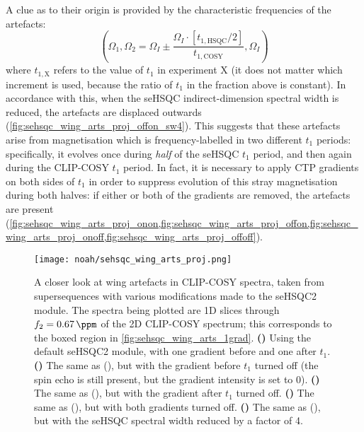 A clue as to their origin is provided by the characteristic frequencies of the artefacts:
\begin{equation}
    \label{eq:wing_artefact_frequencies}
    \left(\Omega_1, \Omega_2 = \Omega_I \pm \frac{\Omega_I \cdot [t_{1,\text{HSQC}}/2]}{t_{1,\text{COSY}}}, \Omega_I\right)
\end{equation}
where $t_{1,\text{X}}$ refers to the value of $t_1$ in experiment X (it does not matter which increment is used, because the ratio of $t_1$ in the fraction above is constant).
In accordance with this, when the seHSQC indirect-dimension spectral width is reduced, the artefacts are displaced outwards (\cref{fig:sehsqc_wing_arts_proj_offon_sw4}).
This suggests that these artefacts arise from  magnetisation which is frequency-labelled in two different $t_1$ periods: specifically, it evolves once during \textit{half} of the seHSQC $t_1$ period, and then again during the CLIP-COSY $t_1$ period.
In fact, it is necessary to apply CTP gradients on both sides of $t_1$ in order to suppress evolution of this stray magnetisation during both halves: if either or both of the gradients are removed, the artefacts are present (\cref{fig:sehsqc_wing_arts_proj_onon,fig:sehsqc_wing_arts_proj_offon,fig:sehsqc_wing_arts_proj_onoff,fig:sehsqc_wing_arts_proj_offoff}).

\begin{figure}[!ht]
    \centering
    \texttt{[image: noah/sehsqc\_wing\_arts\_proj.png]}%
    {\label{fig:sehsqc_wing_arts_proj_onon}}%
    {\label{fig:sehsqc_wing_arts_proj_offon}}%
    {\label{fig:sehsqc_wing_arts_proj_onoff}}%
    {\label{fig:sehsqc_wing_arts_proj_offoff}}%
    {\label{fig:sehsqc_wing_arts_proj_offon_sw4}}%
    \caption[More detail about wing artefacts in CLIP-COSY spectra]{
        A closer look at wing artefacts in CLIP-COSY spectra, taken from  supersequences with various modifications made to the seHSQC2 module.
        The spectra being plotted are 1D slices through $f_2 = \qty{0.67}{\ppm}$ of the 2D CLIP-COSY spectrum; this corresponds to the boxed region in \cref{fig:sehsqc_wing_arts_1grad}.
        \textbf{()} Using the default seHSQC2 module, with one gradient before and one after $t_1$.
        \textbf{()} The same as (), but with the gradient before $t_1$ turned off (the spin echo is still present, but the gradient intensity is set to 0).
        \textbf{()} The same as (), but with the gradient after $t_1$ turned off.
        \textbf{()} The same as (), but with both gradients turned off.
        \textbf{()} The same as (), but with the seHSQC spectral width reduced by a factor of 4.
    }
    \label{fig:sehsqc_wing_arts_proj}
\end{figure}

